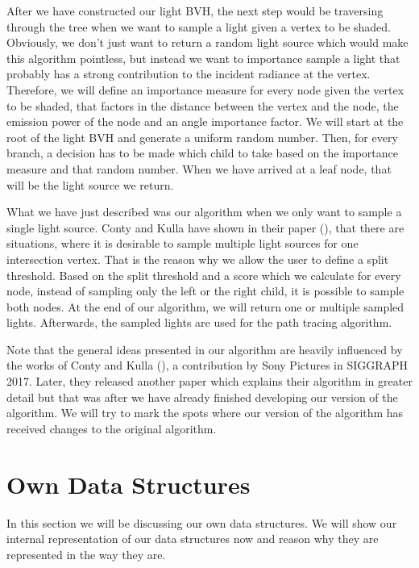 After we have constructed our light BVH, the next step would be traversing through the tree when we want to sample a light given a vertex to be shaded. Obviously, we don't just want to return a random light source which would make this algorithm pointless, but instead we want to importance sample a light that probably has a strong contribution to the incident radiance at the vertex. Therefore, we will define an importance measure for every node given the vertex to be shaded, that factors in the distance between the vertex and the node, the emission power of the node and an angle importance factor. We will start at the root of the light BVH and generate a uniform random number. Then, for every branch, a decision has to be made which child to take based on the importance measure and that random number. When we have arrived at a leaf node, that will be the light source we return.

What we have just described was our algorithm when we only want to sample a single light source. Conty and Kulla have shown in their paper (\cite{MLS}), that there are situations, where it is desirable to sample multiple light sources for one intersection vertex. That is the reason why we allow the user to define a split threshold. Based on the split threshold and a score which we calculate for every node, instead of sampling only the left or the right child, it is possible to sample both nodes. At the end of our algorithm, we will return one or multiple sampled lights. Afterwards, the sampled lights are used for the path tracing algorithm.

Note that the general ideas presented in our algorithm are heavily influenced by the works of Conty and Kulla (\cite{MLA,MLS}), a contribution by Sony Pictures in SIGGRAPH 2017. Later, they released another paper \cite{MLP} which explains their algorithm in greater detail but that was after we have already finished developing our version of the algorithm. We will try to mark the spots where our version of the algorithm has received changes to the original algorithm.

\section{Own Data Structures}
\label{sec:alg:ows}

In this section we will be discussing our own data structures. We will show our internal representation of our data structures now and reason why they are represented in the way they are.

